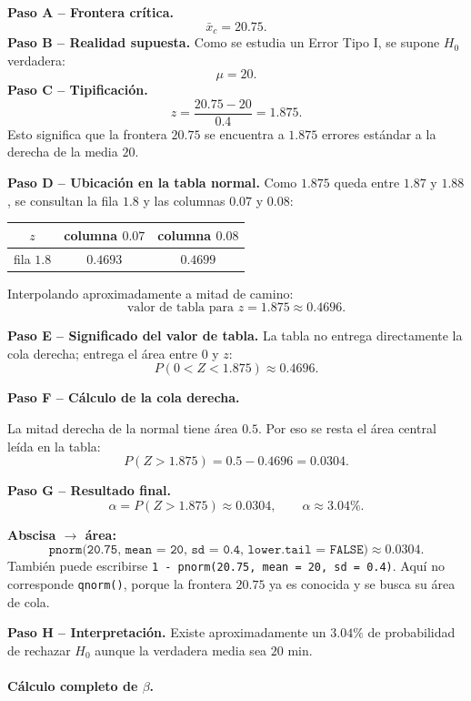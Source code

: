 \documentclass[11pt,a4paper]{article}
\begin{document}
\textbf{Paso A -- Frontera crítica.}
\[
\bar{x}_c=20.75.
\]
\textbf{Paso B -- Realidad supuesta.} Como se estudia un Error Tipo I, se supone $H_0$ verdadera:
\[
\mu=20.
\]
\textbf{Paso C -- Tipificación.}
\[
z=\frac{20.75-20}{0.4}=1.875.
\]
Esto significa que la frontera $20.75$ se encuentra a $1.875$ errores estándar a la derecha de la media $20$.

\textbf{Paso D -- Ubicación en la tabla normal.} Como $1.875$ queda entre $1.87$ y $1.88$, se consultan la fila $1.8$ y las columnas $0.07$ y $0.08$:
\begin{center}
\renewcommand{\arraystretch}{1.25}
\begin{tabular}{c|cc}
\toprule
$z$ & columna $0.07$ & columna $0.08$\\
\midrule
fila $1.8$ & \cellcolor{acceptblue!16}$0.4693$ & \cellcolor{acceptblue!16}$0.4699$\\
\bottomrule
\end{tabular}
\end{center}
Interpolando aproximadamente a mitad de camino:
\[
\boxed{\text{valor de tabla para }z=1.875\approx0.4696}.
\]

\textbf{Paso E -- Significado del valor de tabla.} La tabla no entrega directamente la cola derecha; entrega el área entre $0$ y $z$:
\[
P(0<Z<1.875)\approx0.4696.
\]

\textbf{Paso F -- Cálculo de la cola derecha.}
\begin{regla}
La mitad derecha de la normal tiene área $0.5$. Por eso se resta el área central leída en la tabla:
\[
P(Z>1.875)=\boxed{0.5-0.4696}=0.0304.
\]
\end{regla}

\textbf{Paso G -- Resultado final.}
\[
\boxed{\alpha=P(Z>1.875)\approx0.0304},
\qquad
\boxed{\alpha\approx3.04\%}.
\]

\begin{calculor}
\textbf{Abscisa $\rightarrow$ área:}
\[
\texttt{pnorm(20.75, mean = 20, sd = 0.4, lower.tail = FALSE)}
\approx0.0304.
\]
También puede escribirse \texttt{1 - pnorm(20.75, mean = 20, sd = 0.4)}. Aquí no corresponde \texttt{qnorm()}, porque la frontera $20.75$ ya es conocida y se busca su área de cola.
\end{calculor}

\textbf{Paso H -- Interpretación.} Existe aproximadamente un $3.04\%$ de probabilidad de rechazar $H_0$ aunque la verdadera media sea $20$ min.

\paragraph{Cálculo completo de $\beta$.}
\end{document}
